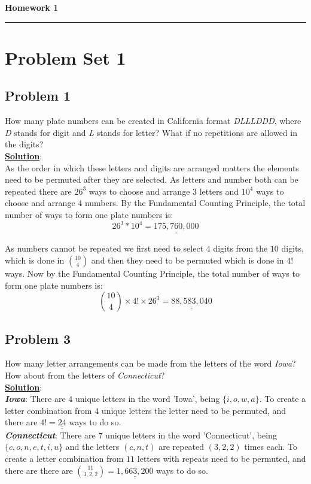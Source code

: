\documentclass[11pt,letter paper]{report}
\begin{document}

\begin{center}
{\bf \Large Homework 1} 
\vspace{0.2cm}
\hrule
\end{center}

%
\section*{Problem Set 1}

\subsection*{Problem 1}
How many plate numbers can be created in California format {\it DLLLDDD}, where {\it D} stands for digit and {\it L} stands for letter? What if no repetitions are allowed in the digits?\\[0.1cm]
{\bf \underline{Solution}}:\\ 
As the order in which these letters and digits are arranged matters the elements need to be permuted after they are selected. As letters and number both can be repeated there are $26^3$ ways to choose and arrange $3$ letters and $10^4$ ways to choose and arrange $4$ numbers. By the Fundamental Counting Principle, the total number of ways to form one plate numbers is: 
$$26^3*10^4=\underline{\underline{175,760,000}}$$

As numbers cannot be repeated we first need to select $4$ digits from the $10$ digits, which is done in $\binom{10}{4}$ and then they need to be permuted which is done in $4!$ ways. Now by the Fundamental Counting Principle, the total number of ways to form one plate numbers is: 
$$\binom{10}{4}\times 4!\times 26^3=\underline{\underline{88,583,040}}$$

\subsection*{Problem 3}
How many letter arrangements can be made from the letters of the word {\it Iowa}? How about from the letters of {\it Connecticut}?\\[0.1cm]
{\bf \underline{Solution}}:\\
{\bf \it Iowa}: There are $4$ unique letters in the word 'Iowa', being $\lbrace i, o, w, a\rbrace$. To create a letter combination from $4$ unique letters the letter need to be permuted, and there are $4!=\underline{\underline{24}}$ ways to do so.\\
{\bf \it Connecticut}: There are $7$ unique letters in the word 'Connecticut', being $\lbrace c, o, n, e, t, i, u\rbrace$ and the letters $(c, n, t)$ are repeated $(3, 2, 2)$ times each. To create a letter combination from $11$ letters with repeats need to be permuted, and there are there are $\binom{11}{3,2,2}=\underline{\underline{1,663,200}}$ ways to do so.
\end{document}
